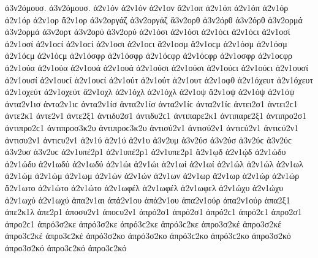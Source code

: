 {ἀ3ν2όμουσ. ἀ3ν2όμουσ.
ἀ2ν1όν ἀ2ν1όν   %
ἀ2ν1ον
ἄ2ν1οπ   %
ἀ2ν1όπ ἀ2ν1όπ
ἀ2ν1όρ ἀ2ν1όρ   %
ἀ2ν1ορ
ἄ2ν1ορ   %
ἀ3ν2οργάζ ἀ3ν2οργάζ   %
ἄ3ν2ορθ   %
ἀ3ν2όρθ ἀ3ν2όρθ
ἀ3ν2ορμά ἀ3ν2ορμά   %
ἀ3ν2ορτ   %
ἀ3ν2ορύ ἀ3ν2ορύ   %
ἀ2ν1όσι ἀ2ν1όσι ἀ2ν1όϲι ἀ2ν1όϲι   %
ἀ2ν1οσί ἀ2ν1οσί ἀ2ν1οϲί ἀ2ν1οϲί
ἀ2ν1οσι ἀ2ν1οϲι   %
ἄ2ν1οσμ ἄ2ν1οϲμ   %
ἀ2ν1όσμ ἀ2ν1όσμ ἀ2ν1όϲμ ἀ2ν1όϲμ
ἀ2ν1όσφρ ἀ2ν1όσφρ ἀ2ν1όϲφρ ἀ2ν1όϲφρ   %
ἀ2ν1οσφρ ἀ2ν1οϲφρ
ἀ2ν1ούα ἀ2ν1ούα   %
ἀ2ν1ουά ἀ2ν1ουά
ἀ2ν1ούσι ἀ2ν1ούσι ἀ2ν1ούϲι ἀ2ν1ούϲι   %
ἀ2ν1ουσί ἀ2ν1ουσί ἀ2ν1ουϲί ἀ2ν1ουϲί
ἀ2ν1ούτ ἀ2ν1ούτ   %
ἀ2ν1ουτ
ἀ2ν1οφθ   %
ἀ2ν1όχευτ ἀ2ν1όχευτ   %
ἀ2ν1οχεύτ ἀ2ν1οχεύτ
ἄ2ν1οχλ   %
ἀ2ν1όχλ ἀ2ν1όχλ
ἀ2ν1οψ   %
ἄ2ν1οψ   %
ἀ2ν1όψ ἀ2ν1όψ
ἀντα2ν1ισ ἀντα2ν1ιϲ   %
ἀντα2ν1ίσ ἀντα2ν1ίσ ἀντα2ν1ίϲ ἀντα2ν1ίϲ   %
ἀντει2σ1 ἀντει2ϲ1   %
ἀντε2κ1   %
ἀντε2ν1   %
ἀντε2ξ1   %
ἀντιδυ2σ1 ἀντιδυ2ϲ1   %
ἀντιπαρε2κ1   %
ἀντιπαρε2ξ1   %
ἀντιπρο2σ1 ἀντιπρο2ϲ1   %
ἀντιπροσ3κ2υ ἀντιπροϲ3κ2υ   %
ἀντισύ2ν1 ἀντισύ2ν1 ἀντιϲύ2ν1 ἀντιϲύ2ν1   %
ἀντισυ2ν1 ἀντιϲυ2ν1
ἀ2ν1ύ ἀ2ν1ύ   %
ἀ2ν1υ
ἀ3ν2υμ   %
ἀ3ν2ύσ ἀ3ν2ύσ ἀ3ν2ύϲ ἀ3ν2ύϲ   %
ἀ3ν2υσ ἀ3ν2υϲ   %
ἀ2ν1υπέ2ρ1 ἀ2ν1υπέ2ρ1   %
ἀ2ν1υπε2ρ1
ἄ2ν1ῳδ   %
ἀ2ν1ῴδ
ἀ2ν1ώδυ ἀ2ν1ώδυ   %
ἀ2ν1ωδύ ἀ2ν1ωδύ   %
ἀ2ν1ώι ἀ2ν1ώι   %
ἀ2ν1ωί ἀ2ν1ωί
ἀ2ν1ώλ ἀ2ν1ώλ   %
ἀ2ν1ωλ
ἀ2ν1ώμ ἀ2ν1ώμ   %
ἀ2ν1ωμ
ἀ2ν1ών ἀ2ν1ών   %
ἀ2ν1ων
ἀ2ν1ωρ   %
ἄ2ν1ωρ   %
ἀ2ν1ώρ ἀ2ν1ώρ
ἄ2ν1ωτο   %
ἀ2ν1ώτο ἀ2ν1ώτο
ἀ2ν1ωφέλ ἀ2ν1ωφέλ   %
ἀ2ν1ωφελ   %
ἀ2ν1ώχυ ἀ2ν1ώχυ   %
ἀ2ν1ωχύ ἀ2ν1ωχύ
ἀπα2ν1αι   %
ἀπά2ν1ου ἀπά2ν1ου   %
ἀπα2ν1ούρ ἀπα2ν1ούρ
ἁπα2ξ1   %
ἀπε2κ1λ   %
ἁπε2ρ1   %
ἀποσυ2ν1 ἀποϲυ2ν1   %
ἀπρό2σ1 ἀπρό2σ1 ἀπρό2ϲ1 ἀπρό2ϲ1   %
ἀπρο2σ1 ἀπρο2ϲ1
ἀπρό3σ2κε ἀπρό3σ2κε ἀπρό3ϲ2κε ἀπρό3ϲ2κε   %
ἀπρο3σ2κέ ἀπρο3σ2κέ ἀπρο3ϲ2κέ ἀπρο3ϲ2κέ
ἀπρό3σ2κο ἀπρό3σ2κο ἀπρό3ϲ2κο ἀπρό3ϲ2κο   %
ἀπρο3σ2κό ἀπρο3σ2κό ἀπρο3ϲ2κό ἀπρο3ϲ2κό
}
